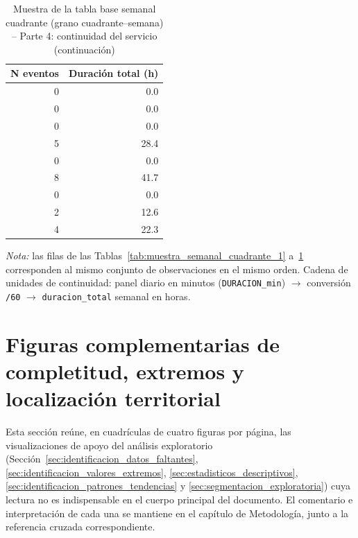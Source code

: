 \begin{table}[!htbp]
\centering
    \small
    \caption{Muestra de la tabla base semanal cuadrante (grano cuadrante--semana) -- Parte 4: continuidad del servicio (continuación)}
    \label{tab:muestra_semanal_cuadrante_4}
    \begin{tabular}{r r}
    \toprule
    \textbf{N eventos} & \textbf{Duración total (h)} \\
    \midrule
     0 &   0.0 \\
     0 &   0.0 \\
     0 &   0.0 \\
     5 &  28.4 \\
     0 &   0.0 \\
     8 &  41.7 \\
     0 &   0.0 \\
     2 &  12.6 \\
     4 &  22.3 \\
    \bottomrule
    \end{tabular}
    \end{table}

\noindent\textit{Nota:} las filas de las Tablas~\ref{tab:muestra_semanal_cuadrante_1} a~\ref{tab:muestra_semanal_cuadrante_4} corresponden al mismo conjunto de observaciones en el mismo orden. Cadena de unidades de continuidad: panel diario en minutos (\texttt{DURACION\_min}) $\rightarrow$ conversión \texttt{/60} $\rightarrow$ \texttt{duracion\_total} semanal en horas.

\section{Figuras complementarias de completitud, extremos y localización territorial}
\label{app:figuras-eda-complementarias}

Esta sección reúne, en cuadrículas de cuatro figuras por página, las visualizaciones de apoyo del análisis exploratorio (Sección~\ref{sec:identificacion_datos_faltantes}, \ref{sec:identificacion_valores_extremos}, \ref{sec:estadisticos_descriptivos}, \ref{sec:identificacion_patrones_tendencias} y \ref{sec:segmentacion_exploratoria}) cuya lectura no es indispensable en el cuerpo principal del documento. El comentario e interpretación de cada una se mantiene en el capítulo de Metodología, junto a la referencia cruzada correspondiente.

